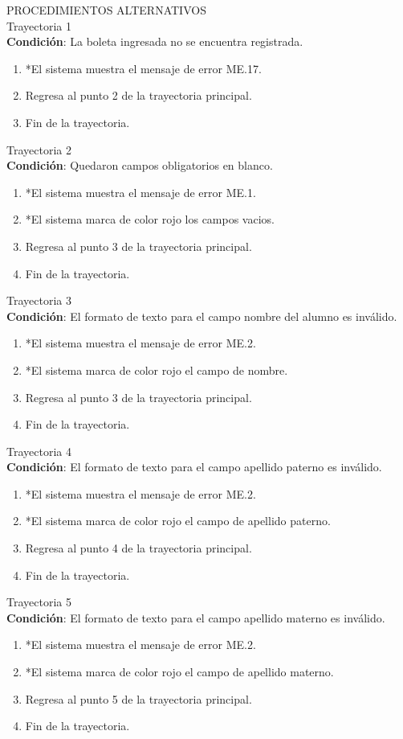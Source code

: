 \vspace*{1cm}
\Large{PROCEDIMIENTOS ALTERNATIVOS}\\
\large{Trayectoria 1}\\
\textbf{Condición}: La boleta ingresada no se encuentra registrada.
\begin{enumerate}
    \item *El sistema muestra el mensaje de error ME.17.
    \item Regresa al punto 2 de la trayectoria principal.
    \item Fin de la trayectoria.
\end{enumerate}
\large{Trayectoria 2}\\
\textbf{Condición}: Quedaron campos obligatorios en blanco.
\begin{enumerate}
    \item *El sistema muestra el mensaje de error ME.1.
    \item *El sistema marca de color rojo los campos vacios.
\item Regresa al punto 3 de la trayectoria principal.
    \item Fin de la trayectoria.
\end{enumerate}
\large{Trayectoria 3}\\
\textbf{Condición}: El formato de texto para el campo nombre del alumno es inválido.
\begin{enumerate}
    \item *El sistema muestra el mensaje de error ME.2.
    \item *El sistema marca de color rojo el campo de nombre.
    \item Regresa al punto 3 de la trayectoria principal.
    \item Fin de la trayectoria.
\end{enumerate}
\large{Trayectoria 4}\\
\textbf{Condición}: El formato de texto para el campo apellido paterno es inválido.
\begin{enumerate}
    \item *El sistema muestra el mensaje de error ME.2.
    \item *El sistema marca de color rojo el campo de apellido paterno.
    \item Regresa al punto 4 de la trayectoria principal.
    \item Fin de la trayectoria.
\end{enumerate}
\large{Trayectoria 5}\\
\textbf{Condición}: El formato de texto para el campo apellido materno es inválido.
\begin{enumerate}
    \item *El sistema muestra el mensaje de error ME.2.
    \item *El sistema marca de color rojo el campo de apellido materno.
    \item Regresa al punto 5 de la trayectoria principal.
    \item Fin de la trayectoria.
\end{enumerate}

